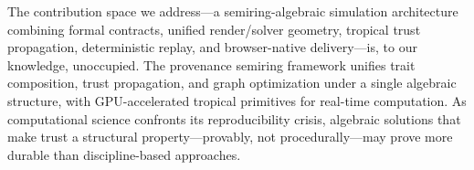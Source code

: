 \documentclass[journal]{IEEEtran}
\begin{document}
The contribution space we address---a semiring-algebraic simulation
architecture combining formal contracts, unified render/solver geometry,
tropical trust propagation, deterministic replay, and browser-native
delivery---is, to our knowledge, unoccupied. The provenance semiring
framework unifies trait composition, trust propagation, and graph
optimization under a single algebraic structure, with GPU-accelerated
tropical primitives for real-time computation. As computational science
confronts its reproducibility crisis, algebraic solutions that make trust
a structural property---provably, not procedurally---may prove more
durable than discipline-based approaches.




\end{document}
